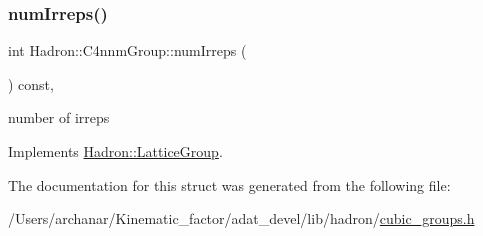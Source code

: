 \subsubsection{\texorpdfstring{numIrreps()}{numIrreps()}\hspace{0.1cm}{\footnotesize\ttfamily [2/2]}}
{\footnotesize\ttfamily int Hadron\+::\+C4nnm\+Group\+::num\+Irreps (\begin{DoxyParamCaption}{ }\end{DoxyParamCaption}) const\hspace{0.3cm}{\ttfamily [inline]}, {\ttfamily [virtual]}}

number of irreps 

Implements \mbox{\hyperlink{structHadron_1_1LatticeGroup_a3edaca488144b5d2a9cf73fe653add34}{Hadron\+::\+Lattice\+Group}}.



The documentation for this struct was generated from the following file\+:\begin{DoxyCompactItemize}
\item 
/\+Users/archanar/\+Kinematic\+\_\+factor/adat\+\_\+devel/lib/hadron/\mbox{\hyperlink{lib_2hadron_2cubic__groups_8h}{cubic\+\_\+groups.\+h}}\end{DoxyCompactItemize}
